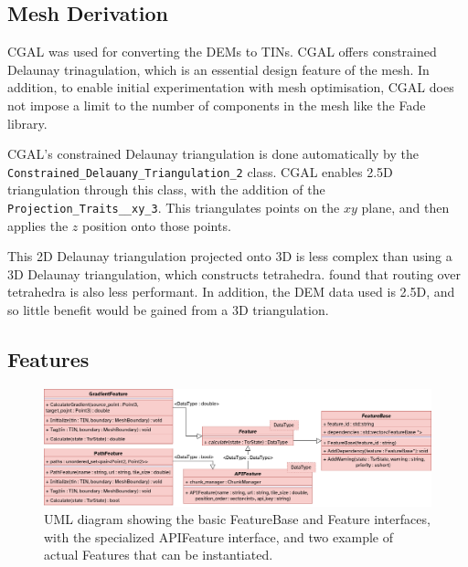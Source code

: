 \documentclass[12pt]{article}
\begin{document}

\subsection{Mesh Derivation}

CGAL was used for converting the DEMs to TINs. CGAL offers constrained Delaunay trinagulation, which is an essential design feature of the mesh. In addition, to enable initial experimentation with mesh optimisation, CGAL does not impose a limit to the number of components in the mesh like the Fade library.

CGAL's constrained Delaunay triangulation is done automatically by the \texttt{Constrained_\allowbreak{}Delauany_\allowbreak{}Triangulation_2} class. CGAL enables 2.5D triangulation through this class, with the addition of the \texttt{Projection_\allowbreak{}Traits_\allowbreak{}_xy_3}. This triangulates points on the $xy$ plane, and then applies the $z$ position onto those points.

This 2D Delaunay triangulation projected onto 3D is less complex than using a 3D Delaunay triangulation, which constructs tetrahedra. \textcite{perkins2013fielddstar} found that routing over tetrahedra is also less performant. In addition, the DEM data used is 2.5D, and so little benefit would be gained from a 3D triangulation.

\subsection{Features}

\begin{figure}[!htbp]
  \centering
  \includegraphics[width=\textwidth]{assets/FeatureBase.png}
  \caption{UML diagram showing the basic FeatureBase and Feature interfaces, with the specialized APIFeature interface, and two example of actual Features that can be instantiated.}\label{impl:features:uml}
\end{figure}

\end{document}

